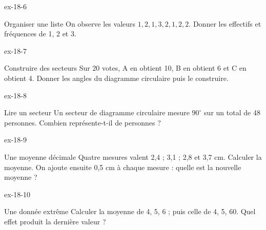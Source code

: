 \begin{blocLivre}{ex-18-6}\begin{exercice}[2]{Organiser une liste}
On observe les valeurs $1,2,1,3,2,1,2,2$. Donner les effectifs et fréquences de 1, 2 et 3.
\end{exercice}\end{blocLivre}
\begin{blocLivre}{ex-18-7}\begin{exercice}[2]{Construire des secteurs}
Sur 20 votes, A en obtient 10, B en obtient 6 et C en obtient 4. Donner les angles du diagramme circulaire puis le construire.
\label{fig-ex-18-7}
\end{exercice}\end{blocLivre}
\begin{blocLivre}{ex-18-8}\begin{exercice}[2]{Lire un secteur}
Un secteur de diagramme circulaire mesure $90^\circ$ sur un total de 48 personnes. Combien représente-t-il de personnes ?
\label{fig-ex-18-8}
\end{exercice}\end{blocLivre}
\begin{blocLivre}{ex-18-9}\begin{exercice}[2]{Une moyenne décimale}
Quatre mesures valent 2,4 ; 3,1 ; 2,8 et 3,7 cm. Calculer la moyenne. On ajoute ensuite 0,5 cm à chaque mesure : quelle est la nouvelle moyenne ?
\end{exercice}\end{blocLivre}
\begin{blocLivre}{ex-18-10}\begin{exercice}[2]{Une donnée extrême}
Calculer la moyenne de 4, 5, 6 ; puis celle de 4, 5, 60. Quel effet produit la dernière valeur ?
\end{exercice}\end{blocLivre}

